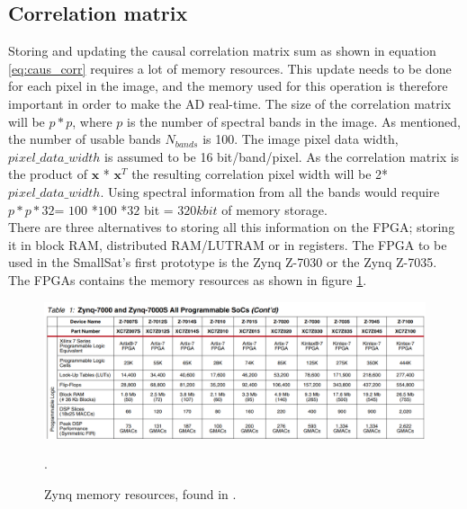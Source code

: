 \subsection{Correlation matrix}
\label{sec:mem_management_correlation_matrix}
Storing and updating the causal correlation matrix sum as shown in equation \ref{eq:caus_corr} requires a lot of memory resources. This update needs to be done for each pixel in the image, and the memory used for this operation is therefore important in order to make the AD real-time. The size of the correlation matrix will be $p * p$, where $p$ is the number of spectral bands in the image. As mentioned, the number of usable bands $N_{bands}$ is 100. The image pixel data width, $pixel\_data\_width$ is assumed to be 16 bit/band/pixel. As the correlation matrix is the product of $\textbf{x}$ * $\textbf{x}^T$ the resulting correlation pixel width will be 2* $pixel\_data\_width$. Using spectral information from all the bands would require $p * p * 32$= $100$ *$100$ *$32$ bit = $320 kbit$ of memory storage. 
\\

There are three alternatives to storing all this information on the FPGA; storing it in block RAM, distributed RAM/LUTRAM or in registers. The FPGA to be used in the SmallSat's first prototype is the Zynq Z-7030 or the Zynq Z-7035. 
The FPGAs contains the memory resources as shown in figure \ref{fig:zynq_memory_resources}.





\begin{figure}[H]
\centering                                                              \includegraphics[scale=0.5]{images/zynq_memory_resources.PNG}
  \caption{Zynq memory resources, found in \cite{cite:mem_resources_zynq}.} 
  \label{fig:zynq_memory_resources}.
\end{figure}

